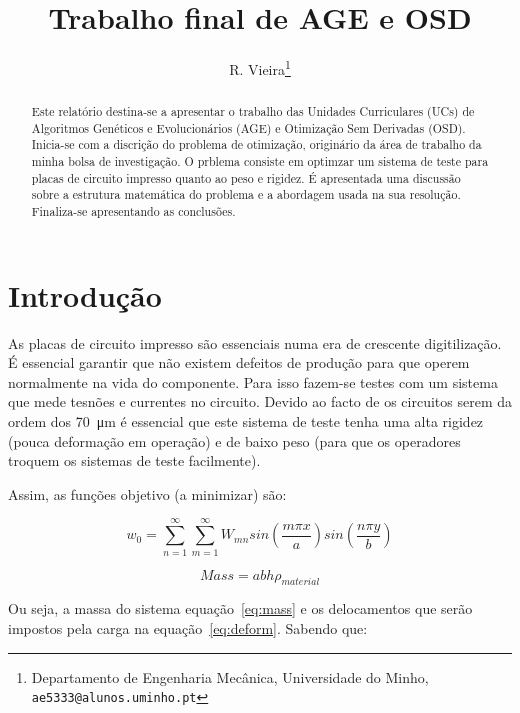 \documentclass[a4paper,12pt]{article}
\begin{document}
%
\title{Trabalho final de AGE e OSD}


\author{R. Vieira\thanks{Departamento de Engenharia Mecânica, Universidade do Minho, {\tt ae5333@alunos.uminho.pt}}}

\maketitle              %

\begin{abstract}
Este relatório destina-se a apresentar o trabalho das Unidades Curriculares (UCs) de Algoritmos Genéticos e Evolucionários (AGE) e Otimização Sem Derivadas (OSD). Inicia-se com a discrição do problema de otimização, originário da área de trabalho da minha bolsa de investigação. O prblema consiste em optimzar um sistema de teste para placas de circuito impresso quanto ao peso e rigidez. É apresentada uma discussão sobre a estrutura matemática do problema e a abordagem usada na sua resolução. Finaliza-se apresentando as conclusões.
\end{abstract}

\section{Introdução}

As placas de circuito impresso são essenciais numa era de crescente digitilização. É essencial garantir que não existem defeitos de produção para que operem normalmente na vida do componente. Para isso fazem-se testes com um sistema que mede tesnões e currentes no circuito. Devido ao facto de os circuitos serem da ordem dos \SI{70}{\micro\metre} é essencial que este sistema de teste tenha uma alta rigidez (pouca deformação em operação) e de baixo peso (para que os operadores troquem os sistemas de teste facilmente). 

Assim, as funções objetivo (a minimizar) são:


\begin{equation}\label{eq:deform}
w_0= \sum_{n=1}^{\infty} \sum_{m=1}^{\infty} W_{mn} sin\left(\frac{m \pi x}{a}\right) sin\left(\frac{n \pi y}{b}\right)
\end{equation}

\begin{equation}\label{eq:mass}
Mass = a b h \rho_{material}
\end{equation}

Ou seja, a massa do sistema equação~\ref{eq:mass} e os delocamentos que serão impostos pela carga na equação~\ref{eq:deform}. Sabendo que:
\end{document}
